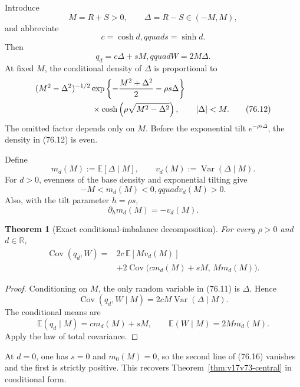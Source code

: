 \documentclass[11pt]{article}
\newtheorem{theorem}{Theorem}[section]
\theoremstyle{remark}
\begin{document}
Introduce
\[
 M=R+S>0,
 \qquad \Delta=R-S\in(-M,M),                     \tag{76.9}
\]
and abbreviate
\[
 c=\cosh d,qquad s=\sinh d.                      \tag{76.10}
\]
Then
\[
 q_d=c\Delta+sM,qquad W=2M\Delta.                \tag{76.11}
\]
At fixed \(M\), the conditional density of \(\Delta\) is proportional
to
\[
\begin{aligned}
 &(M^2-\Delta^2)^{-1/2}
 \exp\left\{-\frac{M^2+\Delta^2}{2}-\rho s\Delta\right\}\\
 &\hspace{24mm}\times
 \cosh\left(\rho\sqrt{M^2-\Delta^2}\right),
 \qquad |\Delta|<M.                              \tag{76.12}
\end{aligned}
\]
The omitted factor depends only on \(M\).  Before the exponential tilt
\(e^{-\rho s\Delta}\), the density in (76.12) is even.

Define
\[
 m_d(M):=\mathbb E[\Delta\mid M],
 \qquad
 v_d(M):=\operatorname{Var}(\Delta\mid M).        \tag{76.13}
\]
For \(d>0\), evenness of the base density and exponential tilting give
\[
 -M<m_d(M)<0,qquad v_d(M)>0.                     \tag{76.14}
\]
Also, with the tilt parameter \(h=\rho s\),
\[
 \partial_hm_d(M)=-v_d(M).                       \tag{76.15}
\]

\begin{theorem}[Exact conditional-imbalance decomposition]
\label{thm:v17v76-decomposition}
For every \(\rho>0\) and \(d\in\mathbb R\),
\[
\boxed{
\begin{aligned}
 \operatorname{Cov}(q_d,W)
 ={}&2c\,\mathbb E[Mv_d(M)]\\
 &+2\operatorname{Cov}
 \bigl(cm_d(M)+sM,\,Mm_d(M)\bigr).
\end{aligned}}                                    \tag{76.16}
\]
\end{theorem}

\begin{proof}
Conditioning on \(M\), the only random variable in (76.11) is
\(\Delta\).  Hence
\[
 \operatorname{Cov}(q_d,W\mid M)
 =2cM\operatorname{Var}(\Delta\mid M).            \tag{76.17}
\]
The conditional means are
\[
 \mathbb E(q_d\mid M)=cm_d(M)+sM,
 \qquad
 \mathbb E(W\mid M)=2Mm_d(M).                    \tag{76.18}
\]
Apply the law of total covariance.
\end{proof}

At \(d=0\), one has \(s=0\) and \(m_0(M)=0\), so the second line of
(76.16) vanishes and the first is strictly positive.  This recovers
Theorem~\ref{thm:v17v73-central} in conditional form.
\end{document}
